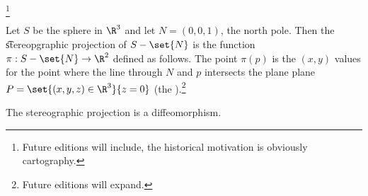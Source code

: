 
\footnote{Future editions will include, the historical motivation is obviously cartography.}


Let $S$ be the sphere in $\R^3$ and let $N = (0, 0, 1)$, the north pole.
Then the \t{stereopgraphic projection} of $S - \set{N}$ is the function $\pi: S - \set{N} \to \R^2$ defined as follows.
The point $\pi(p)$ is the $(x, y)$ values for the point where the line through $N$ and $p$ intersects the plane plane $P = \set{(x, y, z) \in \R^3}{z = 0}$ (the ).\footnote{Future editions will expand.}

\begin{proposition}
  The stereographic projection is a diffeomorphism.
\end{proposition}



\blankpage
